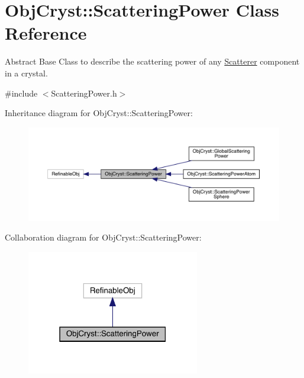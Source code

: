 \hypertarget{class_obj_cryst_1_1_scattering_power}{}\section{Obj\+Cryst\+::Scattering\+Power Class Reference}
\label{class_obj_cryst_1_1_scattering_power}


Abstract Base Class to describe the scattering power of any \mbox{\hyperlink{class_obj_cryst_1_1_scatterer}{Scatterer}} component in a crystal.  




{\ttfamily \#include $<$Scattering\+Power.\+h$>$}



Inheritance diagram for Obj\+Cryst\+::Scattering\+Power\+:
\nopagebreak
\begin{figure}[H]
\begin{center}
\leavevmode
\includegraphics[width=350pt]{class_obj_cryst_1_1_scattering_power__inherit__graph}
\end{center}
\end{figure}


Collaboration diagram for Obj\+Cryst\+::Scattering\+Power\+:
\nopagebreak
\begin{figure}[H]
\begin{center}
\leavevmode
\includegraphics[width=214pt]{class_obj_cryst_1_1_scattering_power__coll__graph}
\end{center}
\end{figure}
